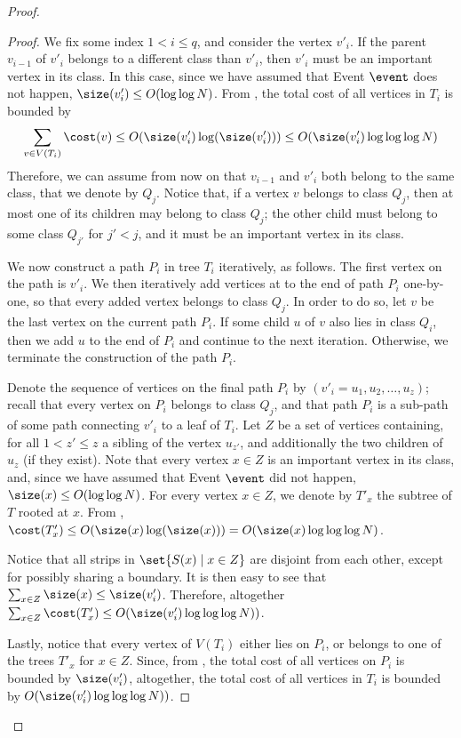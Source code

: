 \documentclass{toc}
\begin{document}
\begin{proof}
\begin{proof}{}
We fix some index $1<i\leq q$, and consider the vertex $v'_i$. If the parent $v_{i-1}$ of $v'_i$ belongs to a different class than $v'_i$, then $v'_i$ must be an important vertex in its class. In this case, since we have assumed that Event $\event$ does not happen, $\size(v'_i)\leq O(\log\log N)$. 
From , the total cost of all vertices in $T_i$ is bounded by 
$$\sum_{v \in V(T_i)} \cost(v) \leq O(\size(v'_i)\log(\size(v'_i)))\leq O(\size(v'_i)\log\log\log N)$$  
Therefore, we can assume from now on that $v_{i-1}$ and $v'_i$ both belong to the same class, that we denote by $Q_j$.
Notice that, if a vertex $v$ belongs to class $Q_j$, then at most one of its children may belong to class $Q_j$; the other child must belong to some class $Q_{j'}$ for $j'<j$, and it must be an important vertex in its class.

We now construct a path $P_i$ in tree $T_i$ iteratively, as follows. 
The first vertex on the path is $v'_i$. 
We then iteratively add vertices at to the end of path $P_i$ one-by-one, so that every added vertex belongs to class $Q_j$. 
In order to do so, let $v$ be the last vertex on the current path $P_i$. 
If some child $u$ of $v$ also lies in class $Q_i$, then we add $u$ to the end of $P_i$ and continue to the next iteration. 
Otherwise, we terminate the construction of the path $P_i$.


Denote the sequence of vertices on the final path $P_i$ by $(v'_i=u_1,u_2,\ldots,u_z)$; recall that every vertex on $P_i$ belongs to class $Q_j$, and that path $P_i$ is a sub-path of some path connecting $v'_i$ to a leaf of $T_i$. Let $Z$ be a set of vertices containing, for all $1<z'\leq z$ a sibling of the vertex $u_{z'}$, and additionally the two children of $u_z$ (if they exist). Note that every vertex $x\in Z$ is an important vertex in its class, and, since we have assumed that Event $\event$ did not happen, $\size(x)\leq O(\log\log N)$. For every vertex $x\in Z$, we denote by $T'_x$ the subtree of $T$ rooted at $x$. From , $\cost(T'_x)\leq O(\size(x)\log(\size(x)))=O(\size(x)\log\log\log N)$.

Notice that all strips in $\set{S(x)\mid x\in Z}$ are disjoint from each other, except for possibly sharing a boundary. It is then easy to see that $\sum_{x\in Z}\size(x)\leq \size(v'_i)$. Therefore, altogether $\sum_{x\in Z}\cost(T'_x)\leq O(\size(v'_i)\log\log\log N))$.

Lastly, notice that every vertex of $V(T_i)$ either lies on $P_i$, or belongs to one of the trees $T'_x$ for $x\in Z$. Since, from , the total cost of all vertices on $P_i$ is bounded by $\size(v'_i)$, altogether, the total cost of all vertices in $T_i$ is bounded by $O(\size(v'_i)\log\log\log N))$.
\end{proof}
\end{proof}
\end{document}
